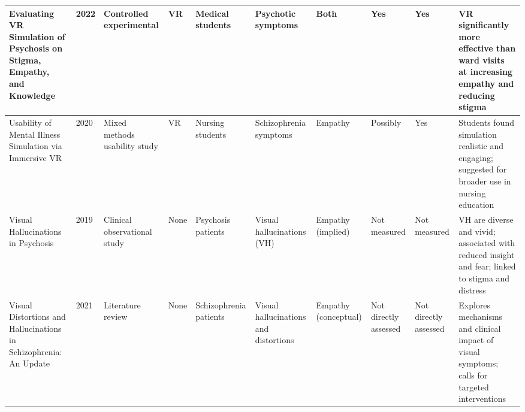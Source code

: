 \begin{landscape}
\begin{longtable}{|p{2.8cm}|p{0.6cm}|p{1.8cm}|p{1.2cm}|p{1.2cm}|p{2cm}|p{1.2cm}|p{1.2cm}|p{1.2cm}|p{3cm}|}
    \hline
    Evaluating VR Simulation of Psychosis on Stigma, Empathy, and Knowledge & 2022 & Controlled experimental & VR & Medical students & Psychotic symptoms & Both & Yes & Yes & VR significantly more effective than ward visits at increasing empathy and reducing stigma \\
    \hline
    Usability of Mental Illness Simulation via Immersive VR & 2020 & Mixed methods usability study & VR & Nursing students & Schizophrenia symptoms & Empathy & Possibly & Yes & Students found simulation realistic and engaging; suggested for broader use in nursing education \\
    \hline
    Visual Hallucinations in Psychosis & 2019 & Clinical observational study & None & Psychosis patients & Visual hallucinations (VH) & Empathy (implied) & Not measured & Not measured & VH are diverse and vivid; associated with reduced insight and fear; linked to stigma and distress \\
    \hline
    Visual Distortions and Hallucinations in Schizophrenia: An Update & 2021 & Literature review & None & Schizophrenia patients & Visual hallucinations and distortions & Empathy (conceptual) & Not directly assessed & Not directly assessed & Explores mechanisms and clinical impact of visual symptoms; calls for targeted interventions \\
    \hline
    \end{longtable}
    \end{landscape}